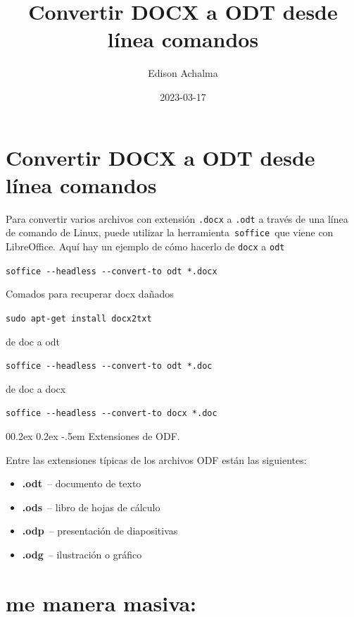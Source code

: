 \documentclass[
  jou,
  floatsintext,
  longtable,
  a4paper,
  nolmodern,
  notxfonts,
  notimes,
  12pt,
  colorlinks=true,linkcolor=blue,citecolor=blue,urlcolor=blue]{apa7}
\title{Convertir DOCX a ODT desde línea comandos}
\author{Edison Achalma}
\affiliation{
{Escuela Profesional de Economía, Universidad Nacional de San Cristóbal
de Huamanga}}
\date{2023-03-17}
\makeatletter
\renewcommand{\paragraph}{\@startsection{paragraph}{4}{\parindent}%
	{0\baselineskip \@plus 0.2ex \@minus 0.2ex}%
	{-.5em}%
	{\normalfont\normalsize\bfseries\typesectitle}}
\providecommand{\tightlist}{%
  \setlength{\itemsep}{0pt}\setlength{\parskip}{0pt}}
\makeatother
\begin{document}
\maketitle


\hypertarget{toc}{}
\tableofcontents
\newpage
\section[Introduction]{Convertir DOCX a ODT desde línea comandos}

\setcounter{secnumdepth}{3}

\setlength\LTleft{0pt}




Para convertir varios archivos con extensión \texttt{.docx} a
\texttt{.odt} a través de una línea de comando de Linux, puede utilizar
la herramienta~\texttt{soffice}~que viene con LibreOffice. Aquí hay un
ejemplo de cómo hacerlo de \texttt{docx} a \texttt{odt}

\texttt{soffice\ -\/-headless\ -\/-convert-to\ odt\ *.docx}

Comados para recuperar docx dañados

\texttt{sudo\ apt-get\ install\ docx2txt}

de doc a odt

\texttt{soffice\ -\/-headless\ -\/-convert-to\ odt\ *.doc}

de doc a docx

\texttt{soffice\ -\/-headless\ -\/-convert-to\ docx\ *.doc}

\paragraph{Extensiones de ODF.}\label{extensiones-de-odf}

Entre las extensiones típicas de los archivos ODF están las siguientes:

\begin{itemize}
\tightlist
\item
  \textbf{.odt}~-- documento de texto
\item
  \textbf{.ods}~-- libro de hojas de cálculo
\item
  \textbf{.odp}~-- presentación de diapositivas
\item
  \textbf{.odg}~-- ilustración o gráfico
\end{itemize}

\section{me manera masiva:}\label{me-manera-masiva}
\end{document}
